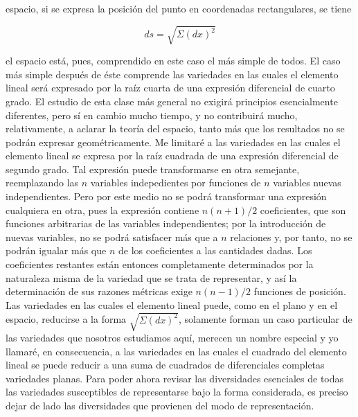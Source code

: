 \documentclass[a4paper, 12pt]{article}
\begin{document}
espacio, si se expresa la posición del punto en coordenadas rectangulares, se tiene

\[
\textstyle ds = \sqrt{\Sigma(dx)^2}
\]

\noindent el espacio está, pues, comprendido en este caso el más simple de todos. El caso más simple después de éste comprende las variedades en las cuales el elemento lineal será expresado por la raíz cuarta de una expresión diferencial de cuarto grado. El estudio de esta clase más general no exigirá principios esencialmente diferentes, pero sí en cambio mucho tiempo, y no contribuirá mucho, relativamente, a aclarar la teoría del espacio, tanto más que los resultados no se podrán expresar geométricamente. Me limitaré a las variedades en las cuales el elemento lineal se expresa por la raíz cuadrada de una expresión diferencial de segundo grado. Tal expresión puede transformarse en otra semejante, reemplazando las $n$ variables indepedientes por funciones de $n$ variables nuevas independientes. Pero por este medio no se podrá
transformar una expresión cualquiera en otra, pues la expresión contiene $n(n+1)/2$ coeficientes, que son funciones arbitrarias de
las variables independientes; por la introducción de nuevas variables, no se podrá satisfacer más que a $n$ relaciones y, por tanto, no se podrán igualar más que $n$ de  los coeficientes a las cantidades dadas. Los coeficientes restantes están entonces completamente determinados por la naturaleza misma de la variedad que se trata de representar, y así la determinación de sus razones métricas exige $n(n-1)/2$ funciones de posición. Las variedades en
las cuales el elemento lineal puede, como en el plano y en el espacio, reducirse a la forma $\sqrt{\Sigma(dx)^2}$, solamente forman un caso particular de las variedades que nosotros estudiamos aquí, merecen un nombre especial y yo llamaré, en consecuencia, a las variedades en las cuales el cuadrado del elemento lineal se puede reducir a una suma de cuadrados de diferenciales completas variedades planas. Para poder ahora revisar las diversidades esenciales de todas las variedades susceptibles de representarse bajo la forma considerada, es preciso dejar de lado las diversidades que provienen del modo de representación.

\bigskip
\end{document}
